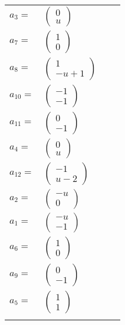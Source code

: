 \documentclass[1p]{elsarticle_modified}
\theoremstyle{definition}
\begin{document}
\begin{tabular}{m{7pt} m{180pt} m{7pt} m{180pt} }
\flushright $a_{3}=$&$\begin{pmatrix}0\\u\end{pmatrix}$ \\
\flushright $a_{7}=$&$\begin{pmatrix}1\\0\end{pmatrix}$ \\
\flushright $a_{8}=$&$\begin{pmatrix}1\\- u+1\end{pmatrix}$ \\
\flushright $a_{10}=$&$\begin{pmatrix}-1\\-1\end{pmatrix}$ \\
\flushright $a_{11}=$&$\begin{pmatrix}0\\-1\end{pmatrix}$ \\
\flushright $a_{4}=$&$\begin{pmatrix}0\\u\end{pmatrix}$ \\
\flushright $a_{12}=$&$\begin{pmatrix}-1\\u-2\end{pmatrix}$ \\
\flushright $a_{2}=$&$\begin{pmatrix}- u\\0\end{pmatrix}$ \\
\flushright $a_{1}=$&$\begin{pmatrix}- u\\-1\end{pmatrix}$ \\
\flushright $a_{6}=$&$\begin{pmatrix}1\\0\end{pmatrix}$ \\
\flushright $a_{9}=$&$\begin{pmatrix}0\\-1\end{pmatrix}$ \\
\flushright $a_{5}=$&$\begin{pmatrix}1\\1\end{pmatrix}$\\&\end{tabular}
\end{document}
